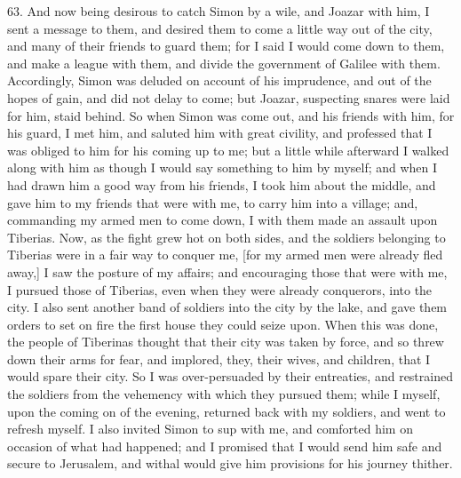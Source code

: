 63. And now being desirous to catch Simon by a wile, and Joazar with him,
I sent a message to them, and desired them to come a little way out of the
city, and many of their friends to guard them; for I said I would come
down to them, and make a league with them, and divide the government of
Galilee with them. Accordingly, Simon was deluded on account of his
imprudence, and out of the hopes of gain, and did not delay to come; but
Joazar, suspecting snares were laid for him, staid behind. So when Simon
was come out, and his friends with him, for his guard, I met him, and
saluted him with great civility, and professed that I was obliged to him
for his coming up to me; but a little while afterward I walked along with
him as though I would say something to him by myself; and when I had drawn
him a good way from his friends, I took him about the middle, and gave him
to my friends that were with me, to carry him into a village; and,
commanding my armed men to come down, I with them made an assault upon
Tiberias. Now, as the fight grew hot on both sides, and the soldiers
belonging to Tiberias were in a fair way to conquer me, [for my armed men
were already fled away,] I saw the posture of my affairs; and encouraging
those that were with me, I pursued those of Tiberias, even when they were
already conquerors, into the city. I also sent another band of soldiers
into the city by the lake, and gave them orders to set on fire the first
house they could seize upon. When this was done, the people of Tiberinas
thought that their city was taken by force, and so threw down their arms
for fear, and implored, they, their wives, and children, that I would
spare their city. So I was over-persuaded by their entreaties, and
restrained the soldiers from the vehemency with which they pursued them;
while I myself, upon the coming on of the evening, returned back with my
soldiers, and went to refresh myself. I also invited Simon to sup with me,
and comforted him on occasion of what had happened; and I promised that I
would send him safe and secure to Jerusalem, and withal would give him
provisions for his journey thither.

